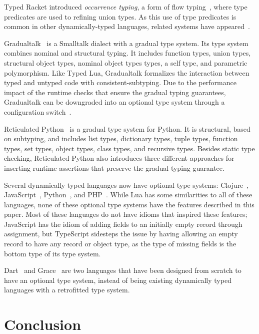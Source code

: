 \documentclass{sigplanconf}
\begin{document}
Typed Racket introduced {\em occurrence typing}, a form of
flow typing~\cite{tobin-hochstadt2010ltu}, where type
predicates are used to refining union types.
As this use of type predicates is common in other
dynamically-typed languages, related systems
have appeared~\cite{guha2011tlc,winther2011gtp,pearce2013ccf}.

Gradualtalk~\cite{allende2013gts} is a Smalltalk dialect 
with a gradual type system. Its type system combines
nominal and structural typing.
It includes function types, union types, structural object types,
nominal object types types, a self type, and parametric polymorphism. Like Typed Lua, Gradualtalk formalizes the
interaction between typed and untyped code with consistent-subtyping. Due to the performance impact of
the runtime checks that ensure the gradual typing guarantees,
Gradualtalk can be downgraded into an optional type system
through a configuration switch~\cite{allende2013cis}.

Reticulated Python~\cite{vitousek2014deg} is a
gradual type system for Python. It is structural, based on subtyping, and includes list types,
dictionary types, tuple types, function types, set types,
object types, class types, and recursive types.
Besides static type checking, Reticulated Python also introduces
three different approaches for inserting runtime assertions
that preserve the gradual typing guarantee.

Several dynamically typed languages now have optional
type systems: Clojure~\cite{bonnaire-sergeant2012typed-clojure},
JavaScript~\cite{typescript}, Python~\cite{mypy}, 
and PHP~\cite{hack}. While Lua has some similarities to
all of these languages, none of these optional type
systems have the features described in this paper.
Most of these languages do not have idioms
that inspired these features; JavaScript has the
idiom of adding fields to an initially empty
record through assignment, but TypeScript sidesteps
the issue by having allowing an empty record to
have any record or object type, as the type of
missing fields is the bottom type of its type system.

Dart~\cite{dart} and Grace~\cite{black2013sg} are
two languages that have been designed from scratch
to have an optional type system, instead of being
existing dynamically typed languages with a retrofitted 
type system. 

\section{Conclusion}
\label{sec:conclusion}
\end{document}
